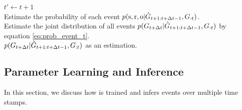 \begin{algorithm}[t]
\begin{small}
    \caption{\small Learning algorithm of \method}\label{alg:renet}
	$t' \leftarrow t+1$\\
	Estimate the probability of each event $p(\mathrm{s},\mathrm{r},\mathrm{o}|\hat{G}_{t+1:t+\Delta t-1},G_{:t})$.\\
	Estimate the joint distribution of all events $p(G_{t+\Delta t}|\hat{G}_{t+1:t+\Delta t-1},G_{:t})$ by equation \eqref{eq:prob_event_t}.
	\\
	\Return $p(G_{t+\Delta t}|\hat{G}_{t+1:t+\Delta t-1},G_{:t})$ as an estimation.
	\end{small}
\end{algorithm}


\subsection{Parameter Learning and Inference}
\label{sec:learn}
In this section, we discuss how \method is trained and infers events over multiple time stamps.

